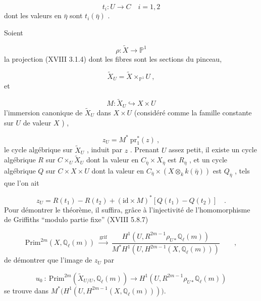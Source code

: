 \begin{equation*}
t_i : U \longrightarrow C \quad i = 1, 2
\end{equation*}
dont les valeurs en $\bar\eta$ sont $t_i(\bar\eta)$ .

Soient

\begin{equation*}
\rho : \widetilde{X} \longrightarrow \mathbb{P}^1
\end{equation*}
la projection (XVIII 3.1.4) dont les fibres sont les sections du pinceau,

\begin{equation*}
\widetilde{X}_U = \widetilde{X} \times_{\mathbb{P}^1} U \ ,
\end{equation*}
et

\begin{equation*}
M : \widetilde{X}_U \hookrightarrow X \times U
\end{equation*}
l'immersion canonique de $\widetilde{X}_U$ dans $X \times U$ (considéré comme la famille constante sur $U$ de valeur $X$ ) ,

\begin{equation*}
z_U = M^* \ \mathrm{pr}_1^*(z) \ ,
\end{equation*}
le cycle algébrique sur $\widetilde{X}_U$ , induit par $z$ . Prenant $U$ assez petit, il existe un cycle algébrique $R$ sur $C \times_U \widetilde{X}_U$ dont la valeur en $C_{\bar\eta} \times X_{\bar\eta}$ est $R_{\bar\eta}$ , et un cycle algébrique $Q$ sur $C \times X \times U$ dont la valeur en $C_{\bar\eta} \times (X \otimes_k k(\bar\eta))$ est $Q_{\bar\eta}$ , tels que l'on ait

\begin{equation}\tag{4.4.13}
z_U = R(t_1) - R(t_2) + (\mathrm{id}\times M)^*[Q(t_1) - Q(t_2)] \quad .
\end{equation}
Pour démontrer le théorème, il suffira, grâce à l'injectivité de
l'homomorphisme de Griffiths  ``modulo partie fixe'' (XVIII 5.8.7)

\begin{equation*}
\mathrm{Prim}^{2m}(X,\mathbb{Q}_\ell(m)) \ \xrightarrow{\ \mathrm{grif}\ }\ \frac{H^1(U,R^{2m-1}\rho_{U*}\mathbb{Q}_\ell(m))}{M^*H^1(U,H^{2m-1}(X,\mathbb{Q}_\ell(m)))} \qquad ,
\end{equation*}
de démontrer que l'image de  $z_U$  par

\begin{equation*}
u_0 \ : \ \mathrm{Prim}^{2m}(\widetilde{X}_{U/U},\mathbb{Q}_\ell(m)) \longrightarrow H^1(U,R^{2m-1}\rho_{U*}\mathbb{Q}_\ell(m))
\end{equation*}
se trouve dans $M^*\bigl(H^1(U,H^{2m-1}(X,\mathbb{Q}_\ell(m)))\bigr)$.

